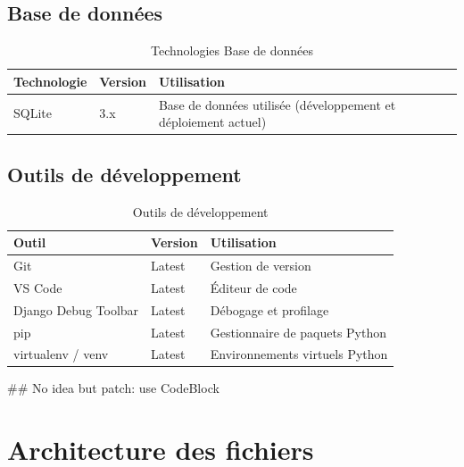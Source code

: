 \documentclass[12pt,a4paper]{report}
\begin{document}
\subsection{Base de données}
\begin{table}[H]
\centering
\begin{tabular}{|p{4cm}|p{4cm}|p{6cm}|}
\hline
\rowcolor{banquiseblue!30}
\textbf{Technologie} & \textbf{Version} & \textbf{Utilisation} \\
\hline
SQLite & 3.x & Base de données utilisée (développement et déploiement actuel) \\
\hline
\end{tabular}
\caption{Technologies Base de données}
\end{table}

\subsection{Outils de développement}
\begin{table}[H]
\centering
\begin{tabular}{|p{4cm}|p{4cm}|p{6cm}|}
\hline
\rowcolor{banquiseblue!30}
\textbf{Outil} & \textbf{Version} & \textbf{Utilisation} \\
\hline
Git & Latest & Gestion de version \\
\hline
VS Code & Latest & Éditeur de code \\
\hline
Django Debug Toolbar & Latest & Débogage et profilage \\
\hline
pip & Latest & Gestionnaire de paquets Python \\
\hline
virtualenv / venv & Latest & Environnements virtuels Python \\
\hline
\end{tabular}
\caption{Outils de développement}
\end{table}

\newpage

## No idea but patch: use CodeBlock
\section{Architecture des fichiers}
\end{document}
